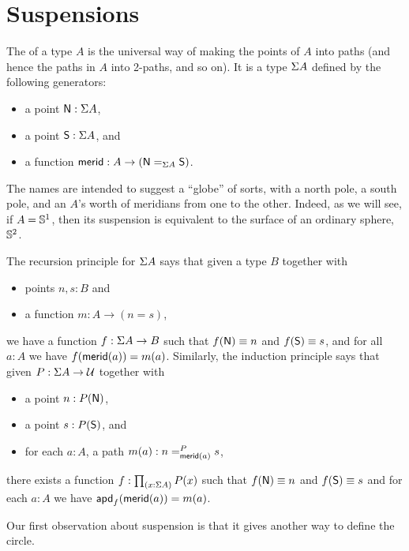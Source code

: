 \section{Suspensions}
\label{sec:suspension}

%
%
The  of a type $A$ is the universal way of making the points of $A$ into paths (and hence the paths in $A$ into 2-paths, and so on).
It is a type $\susp A$ defined by the following generators:
\begin{itemize}
\item a point $\north:\susp A$,
\item a point $\south:\susp A$, and
\item a function $\merid:A \to (\id[\susp A]\north\south)$.
\end{itemize}
The names are intended to suggest a ``globe'' of sorts, with a north pole, a south pole, and an $A$'s worth of meridians
%
from one to the other.
Indeed, as we will see, if $A=\Sn^1$, then its suspension is equivalent to the surface of an ordinary sphere, $\Sn^2$.

%
The recursion principle for $\susp A$ says that given a type $B$ together with
\begin{itemize}
\item points $n,s:B$ and
\item a function $m:A \to (n=s)$,
\end{itemize}
we have a function $f:\susp A \to B$ such that $f(\north)\jdeq n$ and $f(\south)\jdeq s$, and for all $a:A$ we have $\ap f {\merid(a)} = m(a)$.
%
Similarly, the induction principle says that given $P:\susp A \to \type$ together with
\begin{itemize}
\item a point $n:P(\north)$,
\item a point $s:P(\south)$, and
\item for each $a:A$, a path $m(a):\dpath P{\merid(a)}ns$,
\end{itemize}
there exists a function $f:\prd{x:\susp A} P(x)$ such that $f(\north)\jdeq n$ and $f(\south)\jdeq s$ and for each $a:A$ we have $\apd f {\merid(a)} = m(a)$.

Our first observation about suspension is that it gives another way to define the circle.

